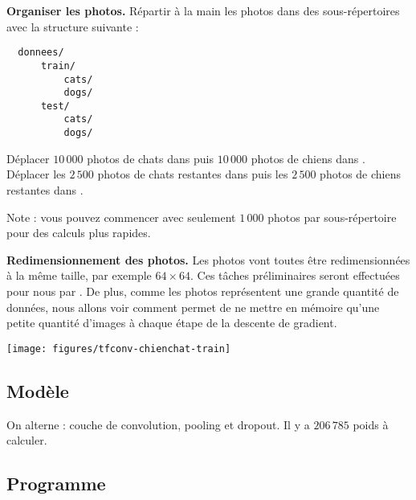 \documentclass[11pt,class=report,crop=false]{standalone}
\begin{document}
\textbf{Organiser les photos.}
Répartir à la main les photos dans des sous-répertoires avec la structure suivante :
\begin{lstlisting}
  donnees/
      train/
          cats/
          dogs/
      test/
          cats/
          dogs/
\end{lstlisting}

Déplacer $10\,000$ photos de chats dans  
 puis $10\,000$ photos de chiens dans .
Déplacer les $2\,500$ photos de chats restantes  dans 
puis les $2\,500$ photos de chiens restantes dans .

Note : vous pouvez commencer avec seulement $1\,000$ photos par sous-répertoire pour des calculs plus rapides.

\textbf{Redimensionnement des photos.}
Les photos vont toutes être redimensionnées à la même taille, par exemple $64 \times 64$.
Ces tâches préliminaires seront effectuées pour nous par \keras.
De plus, comme les photos représentent une grande quantité de données, nous allons voir comment \keras{} permet de ne mettre en mémoire qu'une petite quantité d'images à chaque étape de la descente de gradient.


\begin{center}
\texttt{[image: figures/tfconv-chienchat-train]}
\end{center}


\subsection{Modèle}

On alterne : couche de convolution, pooling et dropout.
Il y a $206\,785$ poids à calculer.



\subsection{Programme}
\end{document}
